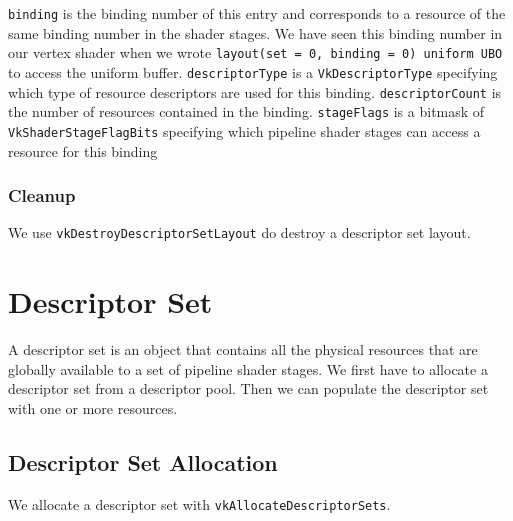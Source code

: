\texttt{binding} is the binding number of this entry and corresponds to
a resource of the same binding number in the shader stages.
We have seen this binding number in our vertex shader when we wrote
\texttt{layout(set = 0, binding = 0) uniform UBO} to access the uniform buffer.
\texttt{descriptorType} is a \texttt{VkDescriptorType} specifying which type of
resource descriptors are used for this binding.
\texttt{descriptorCount} is the number of resources contained in the binding.
\texttt{stageFlags} is a bitmask of \texttt{VkShaderStageFlagBits} specifying which
pipeline shader stages can access a resource for this binding

\begin{minipage}{\linewidth}{\noindent}
    
\end{minipage}

\subsubsection{Cleanup}

We use \texttt{vkDestroyDescriptorSetLayout} do destroy a descriptor
set layout.

\section{Descriptor Set}

A descriptor set is an object that contains all the physical resources that
are globally available to a set of pipeline shader stages.
We first have to allocate a descriptor set from a descriptor pool.
Then we can populate the descriptor set with one or more resources.

\subsection{Descriptor Set Allocation}

We allocate a descriptor set with \texttt{vkAllocateDescriptorSets}.

\begin{minipage}{\linewidth}{\noindent}
    
\end{minipage}

